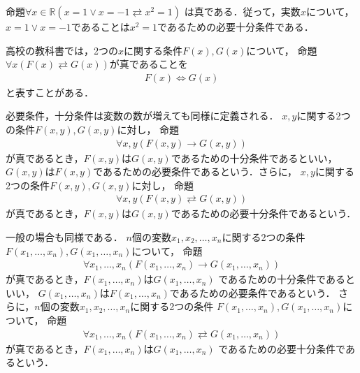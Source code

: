  \begin{ex}
   命題$\forall x \in \mathbb{R} ( x= 1 \lor x = -1 \rightleftarrows x^2 =1)$
   は真である．従って，実数$x$について，
   $x =1 \lor x=-1$であることは$x^2=1$であるための必要十分条件である．
 \end{ex}

 高校の教科書では，2つの$x$に関する条件$F(x) , G(x)$について，
 命題$\forall x (F(x) \rightleftarrows G(x))$が真であることを
 \begin{align}
   F(x) \Longleftrightarrow G(x)
   \label{eq:FGkoukoudouti}
 \end{align}
 と表すことがある．
 
 必要条件，十分条件は変数の数が増えても同様に定義される．
 $x,y$に関する2つの条件$F(x,y),G(x,y)$に対し，
 命題
 \begin{align}
   \forall x,y ( F(x,y) \to G(x,y) )
   \label{eq:FnarabaGxy}
 \end{align}
 が真であるとき，$F(x,y)$は$G(x,y)$であるための十分条件であるといい，
 $G(x,y)$は$F(x,y)$であるための必要条件であるという．さらに，
 $x,y$に関する2つの条件$F(x,y) , G(x,y)$に対し，
 命題
 \begin{align}
   \forall x,y ( F(x,y) \rightleftarrows G(x,y))
   \label{eq:xyFGdouti}
 \end{align}
 が真であるとき，$F(x,y)$は$G(x,y)$であるための必要十分条件であるという．

 一般の場合も同様である．
 $n$個の変数$x_1, x_2, \ldots , x_n$に関する2つの条件
 $F(x_1, \ldots , x_n), G(x_1, \ldots , x_n)$について，
 命題
 \begin{align}
   \forall x_1, \ldots , x_n ( F(x_1, \ldots , x_n ) \to G(x_1, \ldots , x_n))
   \label{eq:nFGnaraba}
 \end{align}
 が真であるとき，$F(x_1, \ldots , x_n)$は$G(x_1, \ldots , x_n)$
 であるための十分条件であるといい，
 $G(x_1, \ldots , x_n)$は$F(x_1, \ldots , x_n)$であるための必要条件であるという．
 さらに，$n$個の変数$x_1, x_2, \ldots , x_n$に関する2つの条件
 $F(x_1, \ldots , x_n), G(x_1, \ldots , x_n)$について，
 命題
 \begin{align}
   \forall x_1, \ldots , x_n ( F(x_1, \ldots , x_n ) \rightleftarrows G(x_1, \ldots , x_n))
   \label{eq:nFGnarabadouti}
 \end{align}
 が真であるとき，$F(x_1, \ldots , x_n)$は$G(x_1, \ldots , x_n)$
 であるための必要十分条件であるという．


